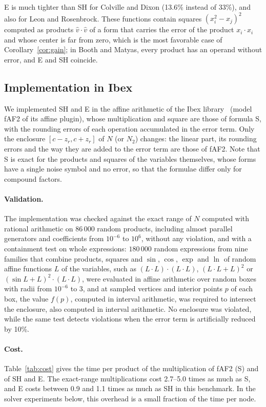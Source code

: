 \documentclass[10pt]{article}
\theoremstyle{definition}
\begin{document}
E is much tighter than SH for Colville and Dixon (13.6\% instead of 33\%), and also for Leon and Rosenbrock. These functions contain squares $(x_i^2-x_j)^2$ computed as products $\hat v\cdot\hat v$ of a form that carries the error of the product $x_i\cdot x_i$ and whose center is far from zero, which is the most favorable case of Corollary~\ref{cor:gain}; in Booth and Matyas, every product has an operand without error, and E and SH coincide.


\subsection{Implementation in Ibex}
\label{sec:ibex}

We implemented SH and E in the affine arithmetic of the Ibex library~\cite{chabert2009,ibexaffine} (model fAF2 of its affine plugin), whose multiplication and square are those of formula S, with the rounding errors of each operation accumulated in the error term. Only the enclosure $[c-z_r,c+z_r]$ of $N$ (or $N_2$) changes: the linear part, its rounding errors and the way they are added to the error term are those of fAF2. Note that S is exact for the products and squares of the variables themselves, whose forms have a single noise symbol and no error, so that the formulae differ only for compound factors.

\paragraph{Validation.} The implementation was checked against the exact range of $N$ computed with rational arithmetic on 86\,000 random products, including almost parallel generators and coefficients from $10^{-6}$ to $10^6$, without any violation, and with a containment test on whole expressions: $180\,000$ random expressions from nine families that combine products, squares and $\sin$, $\cos$, $\exp$ and $\ln$ of random affine functions $L$ of the variables, such as $(L\cdot L)\cdot(L\cdot L)$, $(L\cdot L+L)^2$ or $(\sin L+L)^2\cdot(L\cdot L)$, were evaluated in affine arithmetic over random boxes with radii from $10^{-6}$ to $3$, and at sampled vertices and interior points $p$ of each box, the value $f(p)$, computed in interval arithmetic, was required to intersect the enclosure, also computed in interval arithmetic. No enclosure was violated, while the same test detects violations when the error term is artificially reduced by 10\%.

\paragraph{Cost.} Table~\ref{tab:cost} gives the time per product of the multiplication of fAF2 (S) and of SH and E. The exact-range multiplications cost 2.7--5.0 times as much as S, and E costs between 0.9 and 1.1 times as much as SH in this benchmark. In the solver experiments below, this overhead is a small fraction of the time per node.
\end{document}
